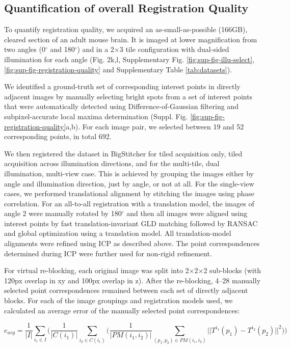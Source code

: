 \subsection*{Quantification of overall Registration Quality}

To quantify registration quality, we acquired an as-small-as-possible (166GB), cleared section of an adult mouse brain. It is imaged at lower magnification from two angles (0${}^\circ$ and 180${}^\circ$) and in a 2$\times$3 tile configuration with dual-sided illumination for each angle (Fig. 2k,l, Supplementary Fig. \ref{fig:sup-fig-illu-select},\ref{fig:sup-fig-registration-quality} and Supplementary Table \ref{tab:datasets}).

We identified a ground-truth set of corresponding interest points in directly adjacent images by manually selecting bright spots from a set of interest points that were automatically detected using Difference-of-Gaussian filtering and subpixel-accurate local maxima determination (Suppl. Fig. \ref{fig:sup-fig-registration-quality}a,b). For each image pair, we selected between 19 and 52 corresponding points, in total 692.

We then registered the dataset in BigStitcher for tiled acquisition only, tiled acquisition across illumination directions, and for the multi-tile, dual illumination, multi-view case. This is achieved by grouping the images either by angle and illumination direction, just by angle, or not at all. 
For the single-view cases, we performed translational alignment by stitching the images using phase correlation. For an all-to-all registration with a translation model, the images of angle 2 were manually rotated by 180${}^\circ$ and then all images were aligned using interest points by fast translation-invariant GLD matching followed by RANSAC\cite{ransac} and global optimization using a translation model. All translation-model alignments were refined using ICP\cite{icp} as described above. The point correspondences determined during ICP were further used for non-rigid refinement.

For virtual re-blocking, each original image was split into 2$\times$2$\times$2 sub-blocks (with 120px overlap in xy and 100px overlap in z). After the re-blocking, 4--28 manually selected point correspondences remained between each set of directly adjacent blocks. For each of the image groupings and registration models used, we calculated an average error of the manually selected point correspondences:

\begin{equation}
\label{eq:regQuality}
e_{avg} = \frac{1}{|I|} \sum_{i_1 \in I} \bigg( \frac{1}{|C(i_1)|} \sum_{i_2 \in C(i_1)} \Big( \frac{1}{|PM(i_1, i_2)|} \sum_{(p_1, p_2) \in PM(i_1, i_2)} || T^{i_1}(p_1) - T^{i_2}(p_2) ||^2 \Big) \bigg)    
\end{equation}

